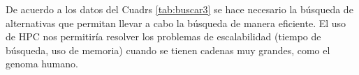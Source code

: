 \documentclass[12pt,a4paper]{article}
\begin{document}
\indent
De acuerdo a los datos del Cuadrs \ref{tab:buscar3} se hace necesario la búsqueda de alternativas que 
permitan llevar a cabo la búsqueda de manera eficiente. El uso de HPC nos permitiría
resolver los problemas de escalabilidad (tiempo de búsqueda, uso de memoria) cuando 
se tienen cadenas muy grandes, como el genoma humano.\\
\end{document}
